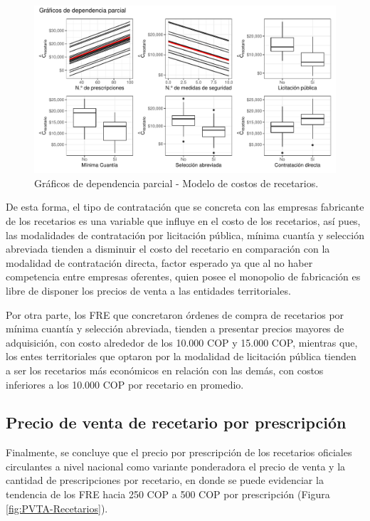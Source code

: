 \documentclass[
]{book}
\begin{document}
\begin{figure}

{\centering \includegraphics[width=0.9\linewidth]{InformeFinal_files/figure-latex/DependParcial1-1} 

}

\caption{Gráficos de dependencia parcial - Modelo de costos de recetarios.}\label{fig:DependParcial1}
\end{figure}

De esta forma, el tipo de contratación que se concreta con las empresas fabricante de los recetarios es una variable que influye en el costo de los recetarios, así pues, las modalidades de contratación por licitación pública, mínima cuantía y selección abreviada tienden a disminuir el costo del recetario en comparación con la modalidad de contratación directa, factor esperado ya que al no haber competencia entre empresas oferentes, quien posee el monopolio de fabricación es libre de disponer los precios de venta a las entidades territoriales.

Por otra parte, los FRE que concretaron órdenes de compra de recetarios por mínima cuantía y selección abreviada, tienden a presentar precios mayores de adquisición, con costo alrededor de los 10.000 COP y 15.000 COP, mientras que, los entes territoriales que optaron por la modalidad de licitación pública tienden a ser los recetarios más económicos en relación con las demás, con costos inferiores a los 10.000 COP por recetario en promedio.

\hypertarget{precio-de-venta-de-recetario-por-prescripciuxf3n}{%
\subsection{Precio de venta de recetario por prescripción}\label{precio-de-venta-de-recetario-por-prescripciuxf3n}}

Finalmente, se concluye que el precio por prescripción de los recetarios oficiales circulantes a nivel nacional como variante ponderadora el precio de venta y la cantidad de prescripciones por recetario, en donde se puede evidenciar la tendencia de los FRE hacia 250 COP a 500 COP por prescripción (Figura \ref{fig:PVTA-Recetarios}).
\end{document}
